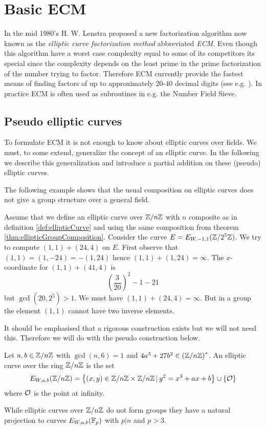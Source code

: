 \chapter{Basic ECM}
\label{cha:basic ECM}
In the mid 1980's H. W. Lenstra proposed a new factorization algorithm now known as the \textit{elliptic curve factorization method} abbreviated \textit{ECM}. Even though this algorithm have a worst case complexity equal to some of its competitors its special since the complexity depends on the least prime in the prime factorization of the number trying to factor. Therefore ECM currently provide the fastest means of finding factors of up to approximately 20-40 decimal digits (see e.g. \cite{Brent86someinteger}). In practice ECM is often used as subroutines in e.g. the Number Field Sieve.

\section{Pseudo elliptic curves}
\label{sec:pseudoEC}
To formulate ECM it is not enough to know about elliptic curves over fields. We must, to some extend, generalize the concept of an elliptic curve. In the following we describe this generalization and introduce a partial addition on these (pseudo) elliptic curves. 

The following example shows that the usual composition on elliptic curves does not give a group structure over a general field.
\begin{ex}\label{exa:ringECsubtle}
Assume that we define an elliptic curve over $\mathbb{Z}/n\mathbb{Z}$ with $n$ composite as in definition \ref{def:ellipticCurve} and using the same composition from theorem \ref{thm:ellipticGroupComposition}. Consider the curve $E=E_{W,-1,1}(\mathbb{Z}/2^5\mathbb{Z})$. We try to compute $(1,1)+(24,4)$ on $E$. First observe that $(1,1)=(1,-24)=-(1,24)$ hence $(1,1)+(1,24)=\infty$. The $x$-coordinate for $(1,1)+(41,4)$ is 
\[
	\left(\frac{3}{20}\right)^2-1-21
\]
but $\gcd(20,2^5)>1$. We must have $(1,1)+(24,4)=\infty$. But in a group the element $(1,1)$ cannot have two inverse elements. 
\end{ex}
It should be emphasised that a rigorous construction exists but we will not need this. Therefore we will do with the pseudo construction below.
\begin{defn}\label{def:pseudoC}
Let $a,b\in \mathbb{Z}/n\mathbb{Z}$ with $\gcd(n,6)=1$ and $4a^3+27b^2\in \left(\mathbb{Z}/n\mathbb{Z}\right)^*$. An elliptic curve over the ring $\mathbb{Z}/n\mathbb{Z}$ is the set 
\begin{align*}
	E_{W,a,b}(\mathbb{Z}/n\mathbb{Z})=\left\{ (x,y)\in \mathbb{Z}/n\mathbb{Z} \times \mathbb{Z}/n\mathbb{Z}\,\vert\, y^2=x^3+ax+b\right\}\cup\{\mathcal{O}\}
\end{align*}
where $\mathcal{O}$ is the point at infinity. 
\end{defn}
While elliptic curves over $\mathbb{Z}/n\mathbb{Z}$ do not form groups they have a natural projection to curves $E_{W,a,b}(\mathbb{F}_p)$ with $p\vert n$ and $p>3$. 


